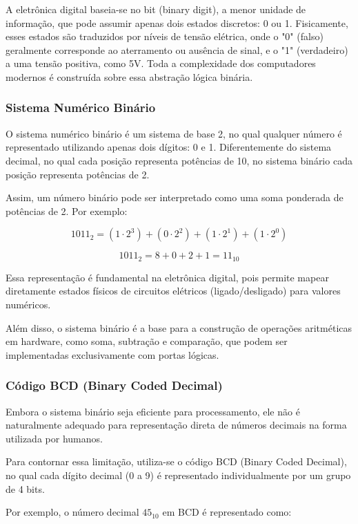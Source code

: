 \documentclass[a4paper,12pt]{article}
\begin{document}
A eletrônica digital baseia-se no bit (binary digit), a menor unidade de informação, que pode assumir apenas dois estados discretos: 0 ou 1. Fisicamente, esses estados são traduzidos por níveis de tensão elétrica, onde o "0" (falso) geralmente corresponde ao aterramento ou ausência de sinal, e o "1" (verdadeiro) a uma tensão positiva, como 5V. Toda a complexidade dos computadores modernos é construída sobre essa abstração lógica binária.

\subsubsection{Sistema Numérico Binário}

O sistema numérico binário é um sistema de base 2, no qual qualquer número é representado utilizando apenas dois dígitos: 0 e 1. Diferentemente do sistema decimal, no qual cada posição representa potências de 10, no sistema binário cada posição representa potências de 2.

Assim, um número binário pode ser interpretado como uma soma ponderada de potências de 2. Por exemplo:

\[
1011_2 = (1 \cdot 2^3) + (0 \cdot 2^2) + (1 \cdot 2^1) + (1 \cdot 2^0)
\]

\[
1011_2 = 8 + 0 + 2 + 1 = 11_{10}
\]

Essa representação é fundamental na eletrônica digital, pois permite mapear diretamente estados físicos de circuitos elétricos (ligado/desligado) para valores numéricos.

Além disso, o sistema binário é a base para a construção de operações aritméticas em hardware, como soma, subtração e comparação, que podem ser implementadas exclusivamente com portas lógicas.

\subsubsection{Código BCD (Binary Coded Decimal)}

Embora o sistema binário seja eficiente para processamento, ele não é naturalmente adequado para representação direta de números decimais na forma utilizada por humanos.

Para contornar essa limitação, utiliza-se o código BCD (Binary Coded Decimal), no qual cada dígito decimal (0 a 9) é representado individualmente por um grupo de 4 bits.

Por exemplo, o número decimal $45_{10}$ em BCD é representado como:
\end{document}
